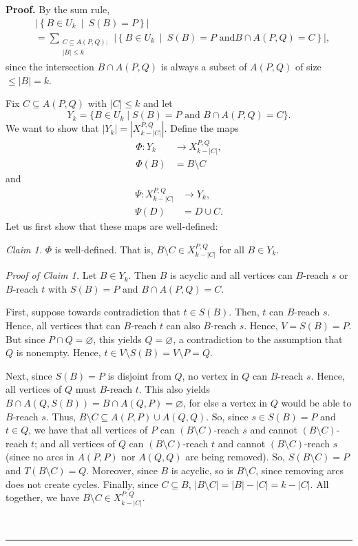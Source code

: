 \documentclass[numbers=enddot,12pt,final,onecolumn,notitlepage]{scrartcl}%
\theoremstyle{definition}
\newenvironment{proof}[1][Proof]{\noindent\textbf{#1.} }{\ \rule{0.5em}{0.5em}}
\let\sumnonlimits\sum
\renewcommand{\sum}{\sumnonlimits\limits}
\theoremstyle{plainsl}
\begin{document}
\begin{proof}
By the sum rule,
\begin{align*}
&  \left\vert \left\{  B\in U_{k}\ \mid\ S\left(  B\right)  =P\right\}
\right\vert \\
&  =\sum_{\substack{C\subseteq A\left(  P,Q\right) ; \\\left| B\right|  \leq
k}} \left\vert \left\{  B\in U_{k}\ \mid\ S\left(  B\right)  =P\text{ and
}B\cap A\left(  P,Q\right)  =C\right\}  \right\vert ,
\end{align*}
since the intersection $B\cap A\left(  P,Q\right)  $ is always a subset of
$A\left(  P,Q\right)  $ of size $\leq\left| B\right|  = k$.

Fix $C \subseteq A(P,Q)$ with $|C| \leq k$ and let
\[
Y_{k} = \{B \in U_{k} \mid S(B) = P \text{ and } B \cap A(P,Q) = C\}.
\]
We want to show that $|Y_{k}| = |X_{k-|C|}^{P,Q}|$. Define the maps
\begin{align*}
\Phi: Y_{k}  & \to X_{k-|C|}^{P,Q},\\
\Phi(B)  & = B \setminus C
\end{align*}
and
\begin{align*}
\Psi: X_{k-|C|}^{P,Q}  & \to Y_{k},\\
\Psi(D)  & = D \cup C.
\end{align*}
Let us first show that these maps are well-defined:

\textit{Claim 1.} $\Phi$ is well-defined. That is, $B \setminus C \in
X_{k-|C|}^{P,Q}$ for all $B \in Y_{k}$.

\smallskip\textit{Proof of Claim 1.} Let $B \in Y_{k}$. Then $B$ is acyclic
and all vertices can $B$-reach $s$ or $B$-reach $t$ with $S(B) = P$ and $B
\cap A(P,Q) = C$.

First, suppose towards contradiction that $t \in S(B)$. Then, $t$ can
$B$-reach $s$. Hence, all vertices that can $B$-reach $t$ can also $B$-reach
$s$. Hence, $V = S(B) = P$. But since $P \cap Q = \varnothing$, this yields $Q
= \varnothing$, a contradiction to the assumption that $Q$ is nonempty. Hence,
$t \in V \setminus S(B) = V \setminus P = Q$.

Next, since $S(B) = P$ is disjoint from $Q$, no vertex in $Q$ can $B$-reach
$s$. Hence, all vertices of $Q$ must $B$-reach $t$. This also yields $B \cap
A(Q,S(B)) = B \cap A(Q,P) = \varnothing$, for else a vertex in $Q$ would be
able to $B$-reach $s$. Thus, $B \setminus C \subseteq A(P,P) \cup A(Q,Q)$. So,
since $s \in S(B) = P$ and $t \in Q$, we have that all vertices of $P$ can $(B
\setminus C)$-reach $s$ and cannot $(B \setminus C)$-reach $t$; and all
vertices of $Q$ can $(B \setminus C)$-reach $t$ and cannot $(B \setminus
C)$-reach $s$ (since no arcs in $A(P,P)$ nor $A(Q,Q)$ are being removed). So,
$S(B \setminus C) = P$ and $T(B \setminus C) = Q$. Moreover, since $B$ is
acyclic, so is $B \setminus C$, since removing arcs does not create cycles.
Finally, since $C \subseteq B$, $|B \setminus C| = |B|-|C| = k-|C|$. All
together, we have $B \setminus C \in X_{k-|C|}^{P,Q}$.


\end{proof}
\end{document}
